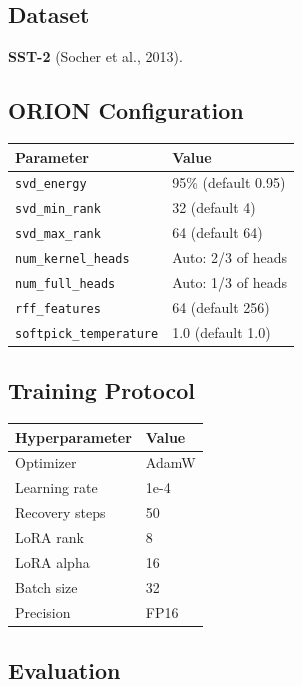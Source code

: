 \subsection{Dataset}

\textbf{SST-2} (Socher et al., 2013).

\subsection{ORION Configuration}

\begin{table}[H]
\centering
\small
\begin{tabular}{ll}
\toprule
\textbf{Parameter} & \textbf{Value} \\
\midrule
\texttt{svd\_energy} & 95\% (default 0.95) \\
\texttt{svd\_min\_rank} & 32 (default 4) \\
\texttt{svd\_max\_rank} & 64 (default 64) \\
\texttt{num\_kernel\_heads} & Auto: 2/3 of heads \\
\texttt{num\_full\_heads} & Auto: 1/3 of heads \\
\texttt{rff\_features} & 64 (default 256) \\
\texttt{softpick\_temperature} & 1.0 (default 1.0) \\
\bottomrule
\end{tabular}
\end{table}

\subsection{Training Protocol}

\begin{table}[H]
\centering
\small
\begin{tabular}{ll}
\toprule
\textbf{Hyperparameter} & \textbf{Value} \\
\midrule
Optimizer & AdamW \\
Learning rate & 1e-4 \\
Recovery steps & 50 \\
LoRA rank & 8 \\
LoRA alpha & 16 \\
Batch size & 32 \\
Precision & FP16 \\
\bottomrule
\end{tabular}
\end{table}

\subsection{Evaluation}

